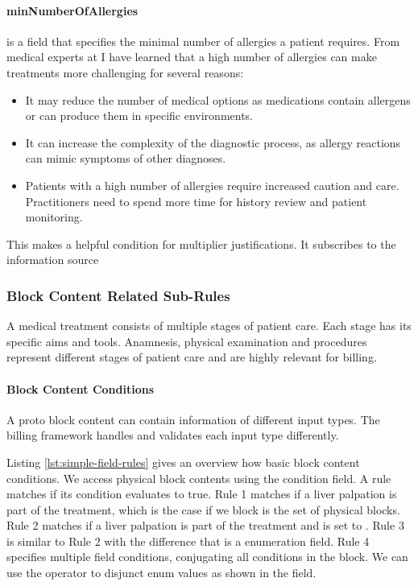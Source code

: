 \paragraph{minNumberOfAllergies}\label{par:minNumberOfAllergies}
\minNumberOfAllergies is a field that specifies the minimal number of allergies a patient requires.
From medical experts at \AV I have learned that a high number of allergies can make treatments more challenging for several reasons:
\begin{itemize}
    \item It may reduce the number of medical options as medications contain allergens or can produce them in specific environments.
    \item It can increase the complexity of the diagnostic process, as allergy reactions can mimic symptoms of other diagnoses.
    \item Patients with a high number of allergies require increased caution and care.
    Practitioners need to spend more time for history review and patient monitoring.
\end{itemize}
This makes \minNumberOfAllergies a helpful condition for multiplier justifications.
It subscribes to the information source 

\subsubsection{Block Content Related Sub-Rules}
A medical treatment consists of multiple stages of patient care.
Each stage has its specific aims and tools.
Anamnesis,
physical examination and procedures represent different stages of patient care and are highly relevant for billing.

\paragraph{Block Content Conditions}\label{par:block-content-field-types}
A proto block content can contain information of different input types.
The billing framework handles and validates each input type differently.



Listing \ref{lst:simple-field-rules} gives an overview how basic block content conditions.
We access physical block contents using the  condition field.
A rule matches if its condition evaluates to true.
Rule 1 matches if a liver palpation is part of the treatment, which is the case if we  block is the set of physical blocks.
Rule 2 matches if a liver palpation is part of the treatment and  is set to \true.
Rule 3 is similar to Rule 2 with the difference that  is a enumeration field.
Rule 4 specifies multiple field conditions, conjugating all conditions in the block.
We can use the \code{|} operator to disjunct enum values as shown in the  field.

